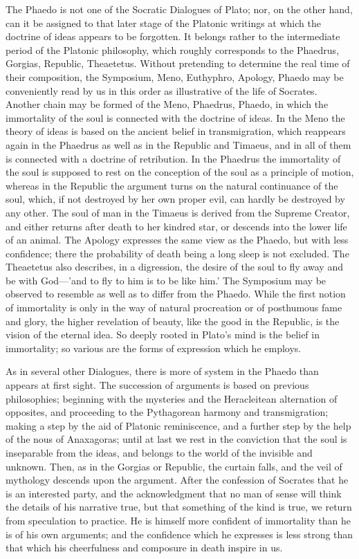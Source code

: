 \documentclass[11pt,letter]{article}
\begin{document}
\par  The Phaedo is not one of the Socratic Dialogues of Plato; nor, on the other hand, can it be assigned to that later stage of the Platonic writings at which the doctrine of ideas appears to be forgotten. It belongs rather to the intermediate period of the Platonic philosophy, which roughly corresponds to the Phaedrus, Gorgias, Republic, Theaetetus. Without pretending to determine the real time of their composition, the Symposium, Meno, Euthyphro, Apology, Phaedo may be conveniently read by us in this order as illustrative of the life of Socrates. Another chain may be formed of the Meno, Phaedrus, Phaedo, in which the immortality of the soul is connected with the doctrine of ideas. In the Meno the theory of ideas is based on the ancient belief in transmigration, which reappears again in the Phaedrus as well as in the Republic and Timaeus, and in all of them is connected with a doctrine of retribution. In the Phaedrus the immortality of the soul is supposed to rest on the conception of the soul as a principle of motion, whereas in the Republic the argument turns on the natural continuance of the soul, which, if not destroyed by her own proper evil, can hardly be destroyed by any other. The soul of man in the Timaeus is derived from the Supreme Creator, and either returns after death to her kindred star, or descends into the lower life of an animal. The Apology expresses the same view as the Phaedo, but with less confidence; there the probability of death being a long sleep is not excluded. The Theaetetus also describes, in a digression, the desire of the soul to fly away and be with God—'and to fly to him is to be like him.' The Symposium may be observed to resemble as well as to differ from the Phaedo. While the first notion of immortality is only in the way of natural procreation or of posthumous fame and glory, the higher revelation of beauty, like the good in the Republic, is the vision of the eternal idea. So deeply rooted in Plato's mind is the belief in immortality; so various are the forms of expression which he employs.

\par  As in several other Dialogues, there is more of system in the Phaedo than appears at first sight. The succession of arguments is based on previous philosophies; beginning with the mysteries and the Heracleitean alternation of opposites, and proceeding to the Pythagorean harmony and transmigration; making a step by the aid of Platonic reminiscence, and a further step by the help of the nous of Anaxagoras; until at last we rest in the conviction that the soul is inseparable from the ideas, and belongs to the world of the invisible and unknown. Then, as in the Gorgias or Republic, the curtain falls, and the veil of mythology descends upon the argument. After the confession of Socrates that he is an interested party, and the acknowledgment that no man of sense will think the details of his narrative true, but that something of the kind is true, we return from speculation to practice. He is himself more confident of immortality than he is of his own arguments; and the confidence which he expresses is less strong than that which his cheerfulness and composure in death inspire in us.
\end{document}
